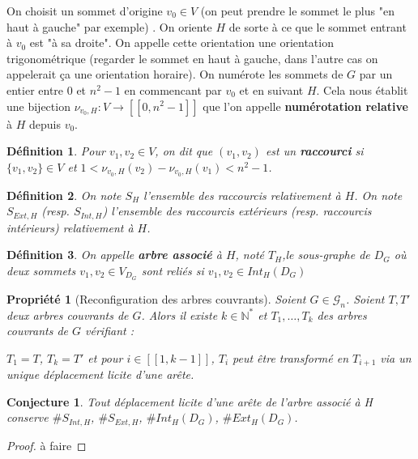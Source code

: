 \documentclass[french,a4paper]{article}
\newtheorem{definition}{Définition}[section]
\newtheorem{property}{Propriété}[section]
\newtheorem{proof}{Preuve}[section]
\newtheorem{conjecture}{Conjecture}[section]
\begin{document}
\smallskip

On choisit un sommet d'origine $v_0 \in V$ (on peut prendre le sommet le plus "en haut à gauche" par exemple) . On oriente $H$ de sorte à ce que le sommet entrant à $v_0$ est "à sa droite". On appelle cette orientation une orientation trigonométrique (regarder le sommet en haut à gauche, dans l'autre cas on appelerait ça une orientation horaire). On numérote les sommets de $G$ par un entier entre $0$ et $n^2-1$ en commencant par $v_0$ et en suivant $H$. Cela nous établit une bijection $\nu_{v_0,H} : V \to [\![0,n^2-1]\!]$ que l'on appelle \textbf{numérotation relative} à $H$ depuis $v_0$.

\begin{definition}
Pour $v_1,v_2 \in V$, on dit que $(v_1,v_2)$ est un \textbf{raccourci} si $\{v_1,v_2\} \in V$ et $1<\nu_{v_0,H}(v_2)-\nu_{v_0,H}(v_1)<n^2-1$.
\end{definition}

\begin{definition}
On note $S_H$ l'ensemble des raccourcis relativement à $H$. On note $S_{Ext,H}$ (resp. $S_{Int,H}$) l'ensemble des raccourcis extérieurs (resp. raccourcis intérieurs) relativement à $H$.
\end{definition}

\begin{definition}
On appelle \textbf{arbre associé} à $H$, noté $T_H$,le sous-graphe de $D_G$ où deux sommets $v_1,v_2 \in V_{D_G}$ sont reliés si $v_1,v_2 \in Int_H(D_G)$
\end{definition}

\begin{property}[Reconfiguration des arbres couvrants]
Soient $G \in \mathcal{G}_n$.
Soient $T,T'$ deux arbres couvrants de $G$. Alors il existe $k \in \mathbb{N}^*$ et $T_1,\dots,T_k$ des arbres couvrants de $G$ vérifiant :

$T_1=T$, $T_k=T'$ et pour $i \in [\![1,k-1]\!]$, $T_{i}$ peut être transformé en $T_{i+1}$ via un unique déplacement licite d'une arête.
\end{property}

\begin{conjecture}
Tout déplacement licite d'une arête de l'arbre associé à H conserve $\#S_{Int,H}$, $\#S_{Ext,H}$, $\#Int_{H}(D_G)$, $\#Ext_{H}(D_G)$.
\end{conjecture}

\begin{proof}
à faire
\end{proof}
\end{document}
